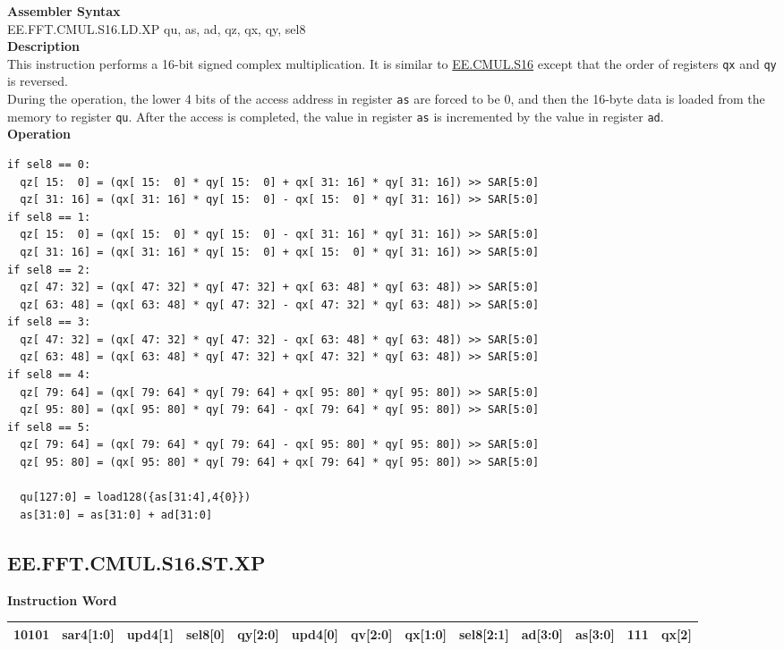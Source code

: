 \textbf{Assembler Syntax} \\
EE.FFT.CMUL.S16.LD.XP qu, as, ad, qz, qx, qy, sel8 \\
\textbf{Description} \\
This instruction performs a 16-bit signed complex multiplication. It is similar to \hyperref[instruction:EECMULS16]{EE.CMUL.S16} except that the order of registers \lstinline{qx} and \lstinline{qy} is reversed.\\
During the operation, the lower 4 bits of the access address in register \lstinline{as} are forced to be 0, and then the 16-byte data is loaded from the memory to register \lstinline{qu}. After the access is completed, the value in register \lstinline{as} is incremented by the value in register \lstinline{ad}.\\
\textbf{Operation}
\begin{lstlisting}
if sel8 == 0:
  qz[ 15:  0] = (qx[ 15:  0] * qy[ 15:  0] + qx[ 31: 16] * qy[ 31: 16]) >> SAR[5:0]
  qz[ 31: 16] = (qx[ 31: 16] * qy[ 15:  0] - qx[ 15:  0] * qy[ 31: 16]) >> SAR[5:0]
if sel8 == 1:
  qz[ 15:  0] = (qx[ 15:  0] * qy[ 15:  0] - qx[ 31: 16] * qy[ 31: 16]) >> SAR[5:0]
  qz[ 31: 16] = (qx[ 31: 16] * qy[ 15:  0] + qx[ 15:  0] * qy[ 31: 16]) >> SAR[5:0]
if sel8 == 2:
  qz[ 47: 32] = (qx[ 47: 32] * qy[ 47: 32] + qx[ 63: 48] * qy[ 63: 48]) >> SAR[5:0]
  qz[ 63: 48] = (qx[ 63: 48] * qy[ 47: 32] - qx[ 47: 32] * qy[ 63: 48]) >> SAR[5:0]
if sel8 == 3:
  qz[ 47: 32] = (qx[ 47: 32] * qy[ 47: 32] - qx[ 63: 48] * qy[ 63: 48]) >> SAR[5:0]
  qz[ 63: 48] = (qx[ 63: 48] * qy[ 47: 32] + qx[ 47: 32] * qy[ 63: 48]) >> SAR[5:0]
if sel8 == 4:
  qz[ 79: 64] = (qx[ 79: 64] * qy[ 79: 64] + qx[ 95: 80] * qy[ 95: 80]) >> SAR[5:0]
  qz[ 95: 80] = (qx[ 95: 80] * qy[ 79: 64] - qx[ 79: 64] * qy[ 95: 80]) >> SAR[5:0]
if sel8 == 5:
  qz[ 79: 64] = (qx[ 79: 64] * qy[ 79: 64] - qx[ 95: 80] * qy[ 95: 80]) >> SAR[5:0]
  qz[ 95: 80] = (qx[ 95: 80] * qy[ 79: 64] + qx[ 79: 64] * qy[ 95: 80]) >> SAR[5:0]

  qu[127:0] = load128({as[31:4],4{0}})
  as[31:0] = as[31:0] + ad[31:0]
\end{lstlisting}

\clearpage
\subsection{EE.FFT.CMUL.S16.ST.XP}\label{instruction:EEFFTCMULS16STXP}
\setlength\tabcolsep{5pt}
\textbf{Instruction Word} \\
\begin{tabular}{|c|c|c|c|c|c|c|c|c|c|c|c|c|}
	\hline
	10101 & sar4[1:0] & upd4[1] & sel8[0] & qy[2:0] & upd4[0] & qv[2:0] & qx[1:0] & sel8[2:1] & ad[3:0] & as[3:0] & 111 & qx[2] \\
	\hline
\end{tabular}

